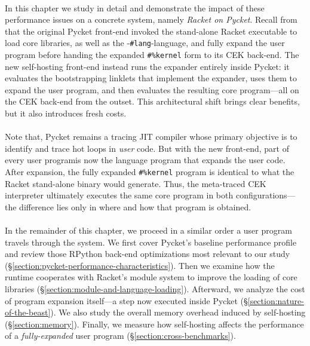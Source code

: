 	\paragraph{}%
	 	In this chapter we study in detail and demonstrate the impact of these performance issues on a concrete system, namely \emph{Racket on Pycket}. Recall from  that the original Pycket front-end invoked the stand-alone Racket executable to load core libraries, as well as the -\verb|#lang|-language, and fully expand the user program before handing the expanded \verb|#%kernel| form to its CEK back-end. The new self-hosting front-end instead runs the expander entirely inside Pycket: it evaluates the bootstrapping linklets that implement the expander, uses them to expand the user program, and then evaluates the resulting core program—all on the CEK back-end from the outset. This architectural shift brings clear benefits, but it also introduces fresh costs.

	\paragraph{}%
		Note that, Pycket remains a tracing JIT compiler whose primary objective is to identify and trace hot loops in \emph{user} code. But with the new front-end, part of every \smartQL user program\smartQR is now the language program that expands the user code. After expansion, the fully expanded \verb|#%kernel| program is identical to what the Racket stand-alone binary would generate. Thus, the meta-traced CEK interpreter ultimately executes the same core program in both configurations—the difference lies only in where and how that program is obtained.

	\paragraph{}%
		In the remainder of this chapter, we proceed in a similar order a user program travels through the system. We first cover Pycket's baseline performance profile and review those RPython back-end optimizations most relevant to our study (\S\ref{section:pycket-performance-characteristics}). Then we examine how the runtime cooperates with Racket's module system to improve the loading of core libraries (\S\ref{section:module-and-language-loading}). Afterward, we analyze the cost of program expansion itself—a step now executed inside Pycket (\S\ref{section:nature-of-the-beast}). We also study the overall memory overhead induced by self-hosting (\S\ref{section:memory}). Finally, we measure how self-hosting affects the performance of a \emph{fully-expanded} user program (\S\ref{section:cross-benchmarks}).

